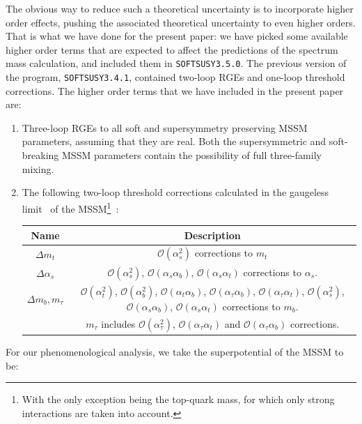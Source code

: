 \documentclass[final,3p,times,pdflatex]{elsarticle}
\begin{document}
The obvious way to reduce such a theoretical uncertainty is to incorporate
higher order effects, pushing the associated theoretical uncertainty to even
higher orders.
That is what we have done for the present paper: we have
picked some available higher order terms that are expected to affect the
predictions of the spectrum mass calculation, and included them in
{\tt SOFTSUSY3.5.0}. The previous version of the program, {\tt SOFTSUSY3.4.1}, 
contained two-loop RGEs and one-loop threshold corrections. 
The higher order terms that we have included in the present paper are: 
\begin{enumerate}
\item
Three-loop RGEs to all soft and supersymmetry preserving MSSM parameters, 
assuming that they are real. Both the supersymmetric and soft-breaking MSSM parameters 
contain the possibility of full three-family mixing. 
\item
The following two-loop threshold
corrections calculated in the gaugeless limit~\cite{Haestier:2005ja} of the MSSM\footnote{With the only exception being the top-quark mass, for which only strong interactions are taken into account.}~\cite{Bednyakov:2005kt,Bednyakov:2009wt}: 
\begin{center}
\begin{tabular}{|c|c|}\hline
Name & Description \\ \hline
$\Delta m_t$ & $\mathcal O(\alpha_s^2)$ corrections to $m_t$ \\
 $\Delta \alpha_s$ & $\mathcal O(\alpha_s^2)$, $\mathcal O(\alpha_s \alpha_b)$,
 $\mathcal O(\alpha_s 
 \alpha_t)$ corrections to $\alpha_s$. \\
 $\Delta m_b, m_\tau$ & $\mathcal O(\alpha_t^2)$, $\mathcal O(\alpha_b^2)$,
$\mathcal O(\alpha_t \alpha_b)$, 
 $\mathcal O(\alpha_\tau \alpha_b)$, 
$\mathcal O(\alpha_\tau \alpha_t)$, 
$\mathcal O(\alpha_s^2)$, $\mathcal O(\alpha_s
 \alpha_b)$, $\mathcal O(\alpha_s \alpha_t)$ 
 corrections to $m_b$. \\ &
$m_\tau$ includes $\mathcal O(\alpha_\tau^2)$, $\mathcal O(\alpha_\tau
\alpha_t)$ and $\mathcal O(\alpha_\tau \alpha_b)$ corrections. 
 \\
\hline \end{tabular}
\end{center}
\end{enumerate}
For our phenomenological analysis, we take the superpotential of the MSSM to be:
\end{document}
